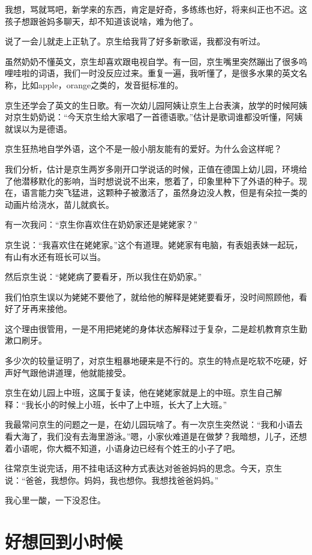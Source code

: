 \documentclass[twoside,openright,headings=optiontohead]{ctexbook} %
\begin{document}
{我想，骂就骂吧，新学来的东西，肯定是好奇，多练练也好，将来纠正也不迟。这孩子想跟爸妈多聊天，却不知道该说啥，难为他了。

说了一会儿就走上正轨了。京生给我背了好多新歌谣，我都没有听过。

虽然奶奶不懂英文，京生却喜欢跟电视自学。有一回，京生嘴里突然蹦出了很多呜哩哇啦的词语，我们一时没反应过来。重复一遍，我听懂了，是很多水果的英文名称，比如apple，orange之类的，发音挺标准的。

京生还学会了英文的生日歌。有一次幼儿园阿姨让京生上台表演，放学的时候阿姨对京生奶奶说：``今天京生给大家唱了一首德语歌。''估计是歌词谁都没听懂，阿姨就误以为是德语。

京生狂热地自学外语，这个不是一般小朋友能有的爱好。为什么会这样呢？

我们分析，估计是京生两岁多刚开口学说话的时候，正值在德国上幼儿园，环境给了他潜移默化的影响，当时想说说不出来，憋着了，印象里种下了外语的种子。现在，语言能力突飞猛进，这颗种子被激活了，虽然身边没人教，但是有朵拉一类的动画片给浇水，苗儿就疯长。

有一次我问：``京生你喜欢住在奶奶家还是姥姥家？''

京生说：``我喜欢住在姥姥家。''这个有道理。姥姥家有电脑，有表姐表妹一起玩，有山有水还有班长可以当。

然后京生说：``姥姥病了要看牙，所以我住在奶奶家。''

我们怕京生误以为姥姥不要他了，就给他的解释是姥姥要看牙，没时间照顾他，看好了牙再来接他。

这个理由很管用，一是不用把姥姥的身体状态解释过于复杂，二是趁机教育京生勤漱口刷牙。

多少次的较量证明了，对京生粗暴地硬来是不行的。京生的特点是吃软不吃硬，好声好气跟他讲道理，他就能接受。

京生在幼儿园上中班，这属于复读，他在姥姥家就是上的中班。京生自己解释：``我长小的时候上小班，长中了上中班，长大了上大班。''

我最常问京生的问题之一是，在幼儿园玩啥了。有一次京生突然说：``我和小语去看大海了，我们没有去海里游泳。''嗯，小家伙难道是在做梦？我暗想，儿子，还想着小语呢，你大概不知道，小语身边已经有个姓王的小子了吧。

往常京生说完话，用不挂电话这种方式表达对爸爸妈妈的思念。今天，京生说：``爸爸，我想你。妈妈，我也想你。我想找爸爸妈妈。''

我心里一酸，一下没忍住。

\chapter*{好想回到小时候}\label{if-younger}

}
\end{document}
